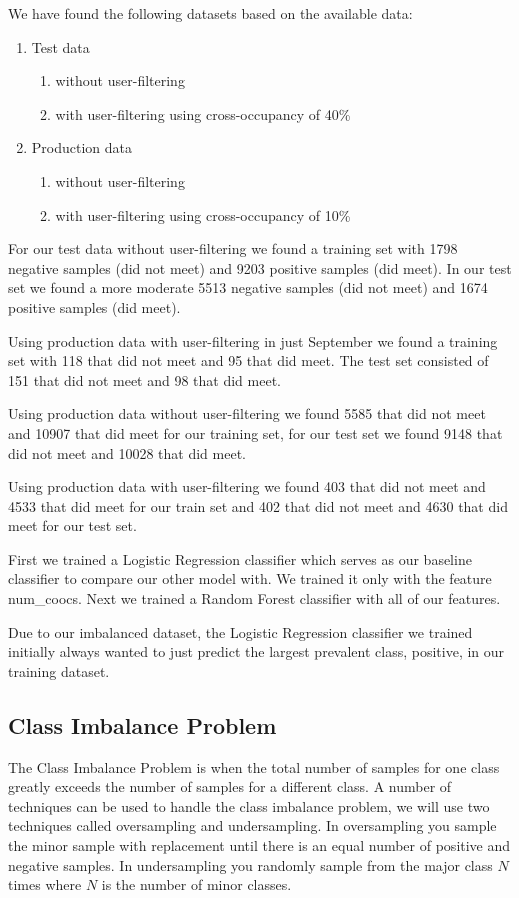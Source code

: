 We have found the following datasets based on the available data:
\begin{enumerate}
\item Test data
\begin{enumerate}
\item without user-filtering
\item with user-filtering using cross-occupancy of 40\%
\end{enumerate}
\item Production data
\begin{enumerate}
\item without user-filtering
\item with user-filtering using cross-occupancy of 10\%
\end{enumerate}
\end{enumerate}


For our test data without user-filtering we found a training set with 1798 negative samples (did not meet) and 9203 positive samples (did meet). In our test set we found a more moderate 5513 negative samples (did not meet) and 1674 positive samples (did meet).

Using production data with user-filtering in just September we found a training set with 118 that did not meet and 95 that did meet. The test set consisted of 151 that did not meet and 98 that did meet. 

Using production data without user-filtering we found 5585 that did not meet and 10907 that did meet for our training set, for our test set we found 9148 that did not meet and 10028 that did meet.

Using production data with user-filtering we found 403 that did not meet and 4533 that did meet for our train set and 402 that did not meet and 4630 that did meet for our test set.

First we trained a Logistic Regression classifier which serves as our baseline classifier to compare our other model with. We trained it only with the feature num\_coocs. Next we trained a Random Forest classifier with all of our features.

Due to our imbalanced dataset, the Logistic Regression classifier we trained initially always wanted to just predict the largest prevalent class, positive, in our training dataset.

\subsection{Class Imbalance Problem}
The Class Imbalance Problem is when the total number of samples for one class greatly exceeds the number of samples for a different class. A number of techniques can be used to handle the class imbalance problem, we will use two techniques called oversampling and undersampling\cite{tan2006introduction}. In oversampling you sample the minor sample with replacement until there is an equal number of positive and negative samples. In undersampling you randomly sample from the major class $N$ times where $N$ is the number of minor classes.

